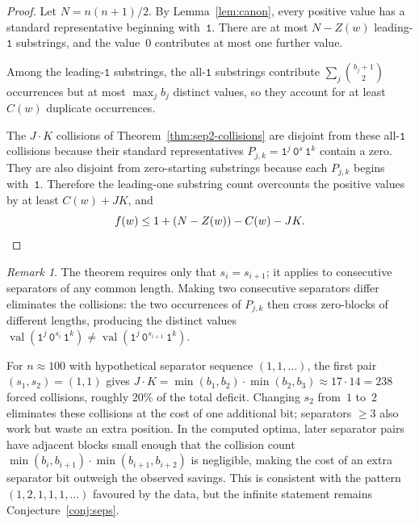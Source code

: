 \documentclass[11pt,a4paper]{article}
\theoremstyle{plain}
\theoremstyle{definition}
\theoremstyle{remark}
\newtheorem{remark}[theorem]{Remark}
\newcommand{\val}{\operatorname{val}}
\begin{document}
\begin{proof}
  Let $N = n(n{+}1)/2$.  By Lemma~\ref{lem:canon}, every positive
  value has a standard representative beginning with~$\mathtt{1}$.
  There are at most $N - Z(w)$ leading-$\mathtt{1}$ substrings, and
  the value~$0$ contributes at most one further value.

  Among the leading-$\mathtt{1}$ substrings, the all-$\mathtt{1}$
  substrings contribute $\sum_j \binom{b_j+1}{2}$ occurrences but at
  most $\max_j b_j$ distinct values, so they account for at least
  $C(w)$ duplicate occurrences.

  The $J \cdot K$ collisions of Theorem~\ref{thm:sep2-collisions} are
  disjoint from these all-$\mathtt{1}$ collisions because their
  standard representatives
  $P_{j,k} = \mathtt{1}^j\,\mathtt{0}^s\,\mathtt{1}^k$ contain a
  zero.  They are also disjoint from zero-starting substrings because
  each $P_{j,k}$ begins with~$\mathtt{1}$.  Therefore the leading-one
  substring count overcounts the positive values by at least
  $C(w) + J K$, and
  \[
    f(w) \le 1 + (N - Z(w)) - C(w) - J K. \qedhere
  \]
\end{proof}

\begin{remark}
  The theorem requires only that $s_i = s_{i+1}$; it applies to
  consecutive separators of any common length.
  Making two consecutive separators differ eliminates the collisions:
  the two occurrences of $P_{j,k}$ then cross zero-blocks of different
  lengths, producing the distinct values
  $\val(\mathtt{1}^j\,\mathtt{0}^{s_i}\,\mathtt{1}^k) \ne
   \val(\mathtt{1}^j\,\mathtt{0}^{s_{i+1}}\,\mathtt{1}^k)$.

  For $n \approx 100$ with hypothetical separator sequence
  $(1, 1, \ldots)$, the first pair $(s_1, s_2) = (1, 1)$ gives
  $J \cdot K = \min(b_1, b_2) \cdot \min(b_2, b_3)
   \approx 17 \cdot 14 = 238$ forced collisions, roughly $20\%$ of
  the total deficit.
  Changing $s_2$ from~$1$ to~$2$ eliminates these collisions at the
  cost of one additional bit; separators $\ge 3$ also work but
  waste an extra position.  In the computed optima, later separator
  pairs have adjacent blocks small enough that the collision count
  $\min(b_i, b_{i+1}) \cdot \min(b_{i+1}, b_{i+2})$ is negligible,
  making the cost of an extra separator bit outweigh the observed
  savings.  This is consistent with the pattern
  $(1, 2, 1, 1, 1, \ldots)$ favoured by the data, but the infinite
  statement remains
  Conjecture~\ref{conj:seps}.
\end{remark}
\end{document}
